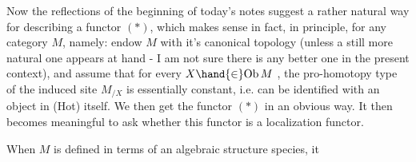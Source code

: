 Now the reflections of the beginning of today's notes  
suggest a rather natural way for describing a functor $(*)$,  which makes
sense in fact,  in principle,  for any category $M$,  namely:  endow $M$ with
it's canonical topology (unless a still more natural one appears at hand
\margin{$($}-  I am not sure there is any better one in the present context),  and
assume that for every  $X\hand{\in}\mathrm{Ob}\,M$ ,  the pro-homotopy type of the induced
site  $M_{/X}$  is essentially constant,  i.e. can be identified with an
object in (Hot) itself.  We then get the functor $(*)$ in an obvious way.
It then becomes meaningful to ask whether this functor is a localization
functor.

When $M$ is defined in terms of an algebraic structure species,  it
